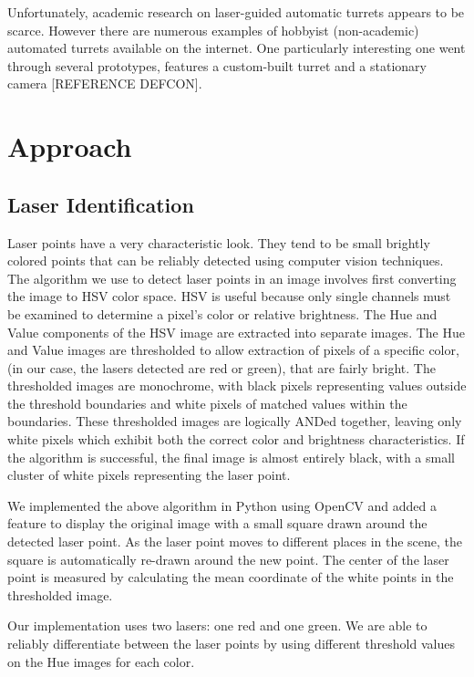 \documentclass[10pt,twocolumn,letterpaper]{article}
\begin{document}
Unfortunately, academic research on laser-guided automatic turrets appears to be scarce.  However there are numerous examples of hobbyist (non-academic) automated turrets available on the internet.  One particularly interesting one went through several prototypes, features a custom-built turret and a stationary camera [REFERENCE DEFCON].

\section{Approach}



\subsection{Laser Identification}

Laser points have a very characteristic look. They tend to be small brightly colored points that can be reliably detected using computer vision techniques. The algorithm we use to detect laser points in an image involves first converting the image to HSV color space. HSV is useful because only single channels must be examined to determine a pixel's color or relative brightness. The Hue and Value components of the HSV image are extracted into separate images. The Hue and Value images are thresholded to allow extraction of pixels of a specific color, (in our case, the lasers detected are red or green), that are fairly bright.  The thresholded images are monochrome, with black pixels representing values outside the threshold boundaries and white pixels of matched values within the boundaries.  These thresholded images are logically ANDed together, leaving only white pixels which exhibit both the correct color and brightness characteristics.  If the algorithm is successful, the final image is almost entirely black, with a small cluster of white pixels representing the laser point.

We implemented the above algorithm in Python using OpenCV and added a feature to display the original image with a small square drawn around the detected laser point.  As the laser point moves to different places in the scene, the square is automatically re-drawn around the new point.  The center of the laser point is measured by calculating the mean coordinate of the white points in the thresholded image.

Our implementation uses two lasers: one red and one green.  We are able to reliably differentiate between the laser points by using different threshold values on the Hue images for each color.
\end{document}
